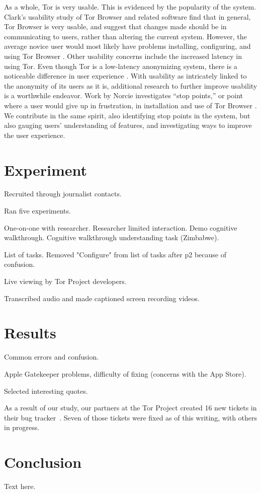 \documentclass{acm_proc_article-sp}
\begin{document}
As a whole, Tor is very usable. This is evidenced by the popularity of the system. Clark's usability study of Tor Browser and related software find that in general, Tor Browser is very usable, and suggest that changes made should be in communicating to users, rather than altering the current system. However, the average novice user would most likely have problems installing, configuring, and using Tor Browser \cite{clark2007usability}. Other usability concerns include the increased latency in using Tor. Even though Tor is a low-latency anonymizing system, there is a noticeable difference in user experience \cite{fabian2010privately}. With usability as intricately linked to the anonymity of its users as it is, additional research to further improve usability is a worthwhile endeavor. Work by Norcie investigates ``stop points,'' or point where a user would give up in frustration, in installation and use of Tor Browser \cite{norcie2012eliminating}. We contribute in the same spirit, also identifying stop points in the system, but also gauging users' understanding of features, and investigating ways to improve the user experience. 

\section{Experiment}

Recruited through journalist contacts.

Ran five experiments.

One-on-one with researcher.
Researcher limited interaction.
Demo cognitive walkthrough.
Cognitive walkthrough understanding task (Zimbabwe).

List of tasks.
Removed "Configure" from list of tasks after p2 because of confusion.

Live viewing by Tor Project developers.

Transcribed audio and made captioned screen recording videos.


\section{Results}

Common errors and confusion.

Apple Gatekeeper problems,
difficulty of fixing (concerns with the App Store).

Selected interesting quotes.

As a result of our study,
our partners at the Tor Project created 16 new tickets in their bug tracker~\cite{uxsprint2015-tickets}.
Seven of those tickets were fixed as of this writing,
with others in progress.

\section{Conclusion}

Text here.


 
\end{document}
